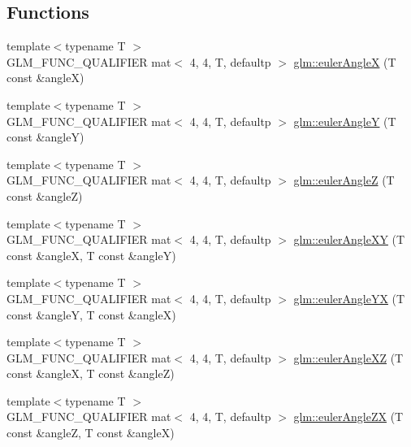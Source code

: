 \subsection*{Functions}
\begin{DoxyCompactItemize}
\item 
{\footnotesize template$<$typename T $>$ }\\G\+L\+M\+\_\+\+F\+U\+N\+C\+\_\+\+Q\+U\+A\+L\+I\+F\+I\+ER mat$<$ 4, 4, T, defaultp $>$ \hyperlink{group__gtx__euler__angles_gafba6282e4ed3ff8b5c75331abfba3489}{glm\+::euler\+AngleX} (T const \&angleX)
\item 
{\footnotesize template$<$typename T $>$ }\\G\+L\+M\+\_\+\+F\+U\+N\+C\+\_\+\+Q\+U\+A\+L\+I\+F\+I\+ER mat$<$ 4, 4, T, defaultp $>$ \hyperlink{group__gtx__euler__angles_gab84bf4746805fd69b8ecbb230e3974c5}{glm\+::euler\+AngleY} (T const \&angleY)
\item 
{\footnotesize template$<$typename T $>$ }\\G\+L\+M\+\_\+\+F\+U\+N\+C\+\_\+\+Q\+U\+A\+L\+I\+F\+I\+ER mat$<$ 4, 4, T, defaultp $>$ \hyperlink{group__gtx__euler__angles_ga5b3935248bb6c3ec6b0d9297d406e251}{glm\+::euler\+AngleZ} (T const \&angleZ)
\item 
{\footnotesize template$<$typename T $>$ }\\G\+L\+M\+\_\+\+F\+U\+N\+C\+\_\+\+Q\+U\+A\+L\+I\+F\+I\+ER mat$<$ 4, 4, T, defaultp $>$ \hyperlink{group__gtx__euler__angles_ga64036577ee17a2d24be0dbc05881d4e2}{glm\+::euler\+Angle\+XY} (T const \&angleX, T const \&angleY)
\item 
{\footnotesize template$<$typename T $>$ }\\G\+L\+M\+\_\+\+F\+U\+N\+C\+\_\+\+Q\+U\+A\+L\+I\+F\+I\+ER mat$<$ 4, 4, T, defaultp $>$ \hyperlink{group__gtx__euler__angles_ga4f57e6dd25c3cffbbd4daa6ef3f4486d}{glm\+::euler\+Angle\+YX} (T const \&angleY, T const \&angleX)
\item 
{\footnotesize template$<$typename T $>$ }\\G\+L\+M\+\_\+\+F\+U\+N\+C\+\_\+\+Q\+U\+A\+L\+I\+F\+I\+ER mat$<$ 4, 4, T, defaultp $>$ \hyperlink{group__gtx__euler__angles_gaa39bd323c65c2fc0a1508be33a237ce9}{glm\+::euler\+Angle\+XZ} (T const \&angleX, T const \&angleZ)
\item 
{\footnotesize template$<$typename T $>$ }\\G\+L\+M\+\_\+\+F\+U\+N\+C\+\_\+\+Q\+U\+A\+L\+I\+F\+I\+ER mat$<$ 4, 4, T, defaultp $>$ \hyperlink{group__gtx__euler__angles_ga483903115cd4059228961046a28d69b5}{glm\+::euler\+Angle\+ZX} (T const \&angleZ, T const \&angleX)

\end{DoxyCompactItemize}

